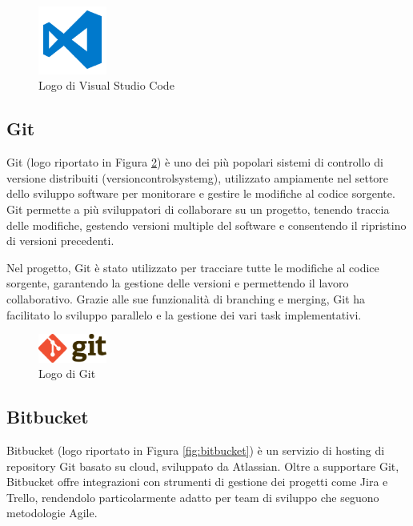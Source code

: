 \begin{figure}[h]
  \centering
  \includegraphics[width=0.2\textwidth]{img/tecnologie/vscode.png}
  \caption{Logo di Visual Studio Code}
  \label{fig:vscode}
\end{figure}

\subsection{Git}

Git (logo riportato in Figura \ref{fig:git}) è uno dei più popolari sistemi di controllo di versione distribuiti (\gls{versioncontrolsystemg}), utilizzato ampiamente nel settore dello sviluppo software per monitorare e gestire le modifiche al codice sorgente. Git permette a più sviluppatori di collaborare su un progetto, tenendo traccia delle modifiche, gestendo versioni multiple del software e consentendo il ripristino di versioni precedenti.

Nel progetto, Git è stato utilizzato per tracciare tutte le modifiche al codice sorgente, garantendo la gestione delle versioni e permettendo il lavoro collaborativo. Grazie alle sue funzionalità di branching e merging, Git ha facilitato lo sviluppo parallelo e la gestione dei vari task implementativi.

\begin{figure}[h]
  \centering
  \includegraphics[width=0.2\textwidth]{img/tecnologie/git.png}
  \caption{Logo di Git}
  \label{fig:git}
\end{figure}

\subsection{Bitbucket}

Bitbucket (logo riportato in Figura \ref{fig:bitbucket}) è un servizio di hosting di repository Git basato su cloud, sviluppato da Atlassian. Oltre a supportare Git, Bitbucket offre integrazioni con strumenti di gestione dei progetti come Jira e Trello, rendendolo particolarmente adatto per team di sviluppo che seguono metodologie Agile.

